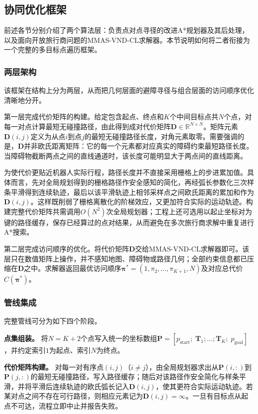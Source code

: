 \documentclass[lettersize,journal]{IEEEtran}
\begin{document}
\subsection{协同优化框架}
\label{subsec:coop}
前述各节分别介绍了两个算法层：负责点对点寻径的改进A*规划器及其后处理，以及面向开放旅行商问题的MMAS-VND-CL求解器。本节说明如何将二者衔接为一个完整的多目标点遍历框架。
\subsubsection{两层架构}
该框架在结构上分为两层，从而把几何层面的避障寻径与组合层面的访问顺序优化清晰地分开。

第一层完成代价矩阵的构建。给定包含起点、终点和$K$个中间目标点共$N$个点，对每一对点计算最短无碰撞路径，由此得到成对代价矩阵$\mathbf{D} \in \mathbb{R}^{N \times N}$。矩阵元素$\mathbf{D}(i, j)$定义为从点$i$到点$j$的最短无碰撞路径长度，对角元素取零。需要强调的是，$\mathbf{D}$并非欧氏距离矩阵：它的每一个元素都对应真实的障碍约束最短路径长度。当障碍物截断两点之间的直线通道时，该长度可能明显大于两点间的直线距离。

为使代价更贴近机器人实际行程，路径长度并不直接采用栅格上的步进累加值。具体而言，先对全局规划得到的栅格路径作安全感知的简化，再经弧长参数化三次样条平滑得到连续轨迹，最后以该平滑轨迹上相邻采样点之间欧氏距离的累加和作为$\mathbf{D}(i, j)$。这样既削弱了栅格离散化的阶梯效应，又更加符合实际的运动轨迹。构建完整代价矩阵共需调用$O(N^2)$次全局规划器；工程上还可选用以起止坐标对为键的路径缓存，保存已经算过的点对结果，从而避免在多次旅行商求解中重复进行A*搜索。

第二层完成访问顺序的优化。将代价矩阵$\mathbf{D}$交给MMAS-VND-CL求解器即可。该层只在数值矩阵上操作，并不感知地图、障碍物或路径几何；全部约束信息都已压缩在$\mathbf{D}$之中。求解器返回最优访问顺序$\bm{\pi}^{*} = (1, \pi_2, \dots, \pi_{K+1}, N)$及对应总代价$C(\bm{\pi}^{*})$。
\subsubsection{管线集成}
完整管线可分为如下四个阶段。

\textbf{点集组装。} 将$N = K + 2$个点写入统一的坐标数组$\mathbf{P} = [p_{\mathrm{start}};\; \mathbf{T}_1; \dots; \mathbf{T}_K;\; p_{\mathrm{goal}}]$，并约定索引$1$为起点、索引$N$为终点。

\textbf{代价矩阵构建。} 对每一对有序点$(i, j)$（$i \neq j$），由全局规划器求出从$\mathbf{P}(i,:)$到$\mathbf{P}(j,:)$的最短无碰撞路径，写入路径缓存；随后对该路径作安全简化与样条平滑，并将平滑后连续轨迹的欧氏弧长记入$\mathbf{D}(i, j)$，使其更符合实际运动轨迹。若某对点之间不存在可行路径，则相应元素记为$\mathbf{D}(i, j) = \infty$。一旦有目标点从起点不可达，流程立即中止并报告失败。
\end{document}

